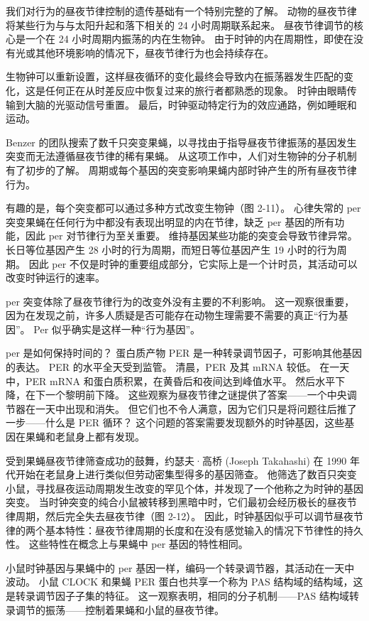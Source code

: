 我们对行为的昼夜节律控制的遗传基础有一个特别完整的了解。 
动物的昼夜节律将某些行为与与太阳升起和落下相关的 24 小时周期联系起来。 
昼夜节律调节的核心是一个在 24 小时周期内振荡的内在生物钟。 
由于时钟的内在周期性，即使在没有光或其他环境影响的情况下，昼夜节律行为也会持续存在。


生物钟可以重新设置，这样昼夜循环的变化最终会导致内在振荡器发生匹配的变化，这是任何正在从时差反应中恢复过来的旅行者都熟悉的现象。 
时钟由眼睛传输到大脑的光驱动信号重置。 
最后，时钟驱动特定行为的效应通路，例如睡眠和运动。


Benzer 的团队搜索了数千只突变果蝇，以寻找由于指导昼夜节律振荡的基因发生突变而无法遵循昼夜节律的稀有果蝇。 
从这项工作中，人们对生物钟的分子机制有了初步的了解。 
周期或每个基因的突变影响果蝇内部时钟产生的所有昼夜节律行为。


有趣的是，每个突变都可以通过多种方式改变生物钟（图 2-11）。 
心律失常的 per 突变果蝇在任何行为中都没有表现出明显的内在节律，缺乏 per 基因的所有功能，因此 per 对节律行为至关重要。 
维持基因某些功能的突变会导致节律异常。 
长日等位基因产生 28 小时的行为周期，而短日等位基因产生 19 小时的行为周期。 
因此 per 不仅是时钟的重要组成部分，它实际上是一个计时员，其活动可以改变时钟运行的速率。


per 突变体除了昼夜节律行为的改变外没有主要的不利影响。 
这一观察很重要，因为在发现之前，许多人质疑是否可能存在动物生理需要不需要的真正“行为基因”。 
Per 似乎确实是这样一种“行为基因”。


per 是如何保持时间的？ 
蛋白质产物 PER 是一种转录调节因子，可影响其他基因的表达。 
PER 的水平全天受到监管。 
清晨，PER 及其 mRNA 较低。 
在一天中，PER mRNA 和蛋白质积累，在黄昏后和夜间达到峰值水平。 
然后水平下降，在下一个黎明前下降。 
这些观察为昼夜节律之谜提供了答案——一个中央调节器在一天中出现和消失。 
但它们也不令人满意，因为它们只是将问题往后推了一步——什么是 PER 循环？ 
这个问题的答案需要发现额外的时钟基因，这些基因在果蝇和老鼠身上都有发现。


受到果蝇昼夜节律筛查成功的鼓舞，约瑟夫·高桥 (Joseph Takahashi) 在 1990 年代开始在老鼠身上进行类似但劳动密集型得多的基因筛查。 
他筛选了数百只突变小鼠，寻找昼夜运动周期发生改变的罕见个体，并发现了一个他称之为时钟的基因突变。 
当时钟突变的纯合小鼠被转移到黑暗中时，它们最初会经历极长的昼夜节律周期，然后完全失去昼夜节律（图 2-12）。 
因此，时钟基因似乎可以调节昼夜节律的两个基本特性：昼夜节律周期的长度和在没有感觉输入的情况下节律性的持久性。 
这些特性在概念上与果蝇中 per 基因的特性相同。


小鼠时钟基因与果蝇中的 per 基因一样，编码一个转录调节器，其活动在一天中波动。 
小鼠 CLOCK 和果蝇 PER 蛋白也共享一个称为 PAS 结构域的结构域，这是转录调节因子子集的特征。 
这一观察表明，相同的分子机制——PAS 结构域转录调节的振荡——控制着果蝇和小鼠的昼夜节律。


